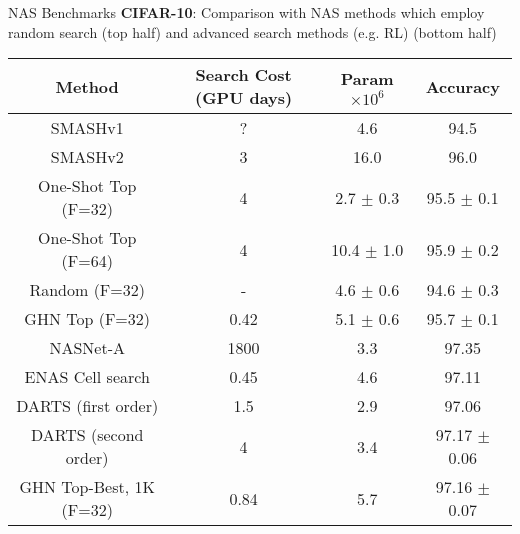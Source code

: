 \documentclass[final,t]{beamer}
\begin{document}
\begin{frame}{}
\begin{columns}[t]
\begin{column}{.47\linewidth}
    \begin{exampleblock}{NAS Benchmarks}
    \textbf{CIFAR-10}: Comparison with NAS methods which employ random search (top half) and advanced search methods (e.g. RL) (bottom half)
  	\begin{table}[t]
\label{table:Results1}
\footnotesize
\begin{center}
\begin{tabular}{ c c c c } 
Method & Search Cost (GPU days) & Param $\times 10^6$ & Accuracy   \\ 
\hline
SMASHv1 \citep{brock2017smash} &? & 4.6 & 94.5 \\
SMASHv2 \citep{brock2017smash} & 3 & 16.0 & 96.0\\
One-Shot Top (F=32) \citep{bender2018understanding} & 4  & 2.7 $\pm$ 0.3 & 95.5 $\pm$ 0.1\\
One-Shot Top (F=64) \citep{bender2018understanding} & 4 & 10.4 $\pm$ 1.0 & 95.9 $\pm$ 0.2\\
\hline
\hline
Random (F=32) & - & 4.6 $\pm$ 0.6 & 94.6 $\pm$ 0.3\\ 
GHN Top (F=32) &  0.42  & 5.1 $\pm$ 0.6 & 95.7 $\pm$ 0.1\\ 
\hline\hline\hline
NASNet-A  \citep{zoph2017learning} & 1800 & 3.3 & 97.35 \\
ENAS Cell search  \citep{pham2018efficient} & 0.45  & 4.6 & 97.11 \\
DARTS (first order)  \citep{liu2018darts} &  1.5  & 2.9  & 97.06  \\
DARTS (second order) \citep{liu2018darts} & 4  & 3.4 & 97.17 $\pm$ 0.06\\
\hline
\hline
GHN Top-Best, 1K (F=32) & 0.84  & 5.7 & 97.16 $\pm$ 0.07 \\
\end{tabular}
\end{center}
\end{table}


\end{exampleblock}
\end{column}
\end{columns}
\end{frame}
\end{document}
